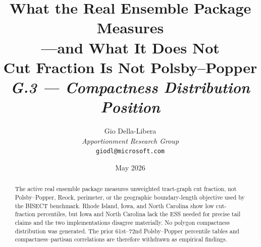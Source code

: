 \documentclass[12pt]{article}
\title{%
  \textbf{What the Real Ensemble Package Measures}\\
  \textbf{---and What It Does Not}\\[0.4em]
  \large Cut Fraction Is Not Polsby--Popper\\[0.8em]
  \normalsize\textit{G.3 --- Compactness Distribution Position}%
}
\author{%
  Gio Della-Libera\\
  \textit{Apportionment Research Group}\\
  \small\texttt{giodl@microsoft.com}
}
\date{May 2026}
\begin{document}
\maketitle

\begin{abstract}
\noindent
The active real ensemble package measures unweighted tract-graph cut fraction,
not Polsby--Popper, Reock, perimeter, or the geographic boundary-length
objective used by the BISECT benchmark. Rhode Island, Iowa, and North Carolina
show low cut-fraction percentiles, but Iowa and North Carolina lack the ESS
needed for precise tail claims and the two implementations disagree materially.
No polygon compactness distribution was generated. The prior 61st--72nd
Polsby--Popper percentile tables and compactness--partisan correlations are
therefore withdrawn as empirical findings.
\end{abstract}

\tableofcontents
\newpage





\end{document}
